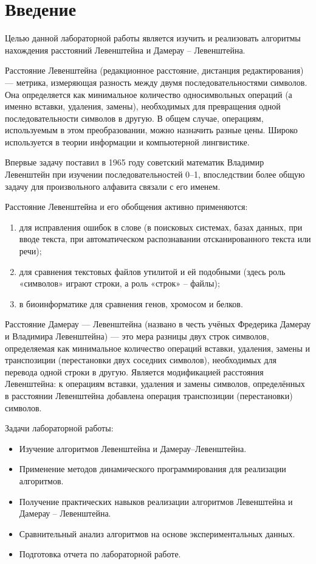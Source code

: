\chapter*{Введение}

Целью данной лабораторной работы является изучить и реализовать алгоритмы нахождения расстояний Левенштейна и Дамерау -- Левенштейна.

Расстояние Левенштейна (редакционное расстояние, дистанция редактирования) — метрика, измеряющая разность между двумя последовательностями символов. Она определяется как минимальное количество односимвольных операций (а именно вставки, удаления, замены), необходимых для превращения одной последовательности символов в другую. В общем случае, операциям, используемым в этом преобразовании, можно назначить разные цены. Широко используется в теории информации и компьютерной лингвистике.

Впервые задачу поставил в 1965 году советский математик Владимир Левенштейн при изучении последовательностей 0--1, впоследствии более общую задачу для произвольного алфавита связали с его именем.

Расстояние Левенштейна и его обобщения активно применяются: 
\begin{enumerate}[label={\arabic*)}]
	\item для исправления ошибок в слове (в поисковых системах, базах данных, при вводе текста, при автоматическом распознавании отсканированного текста или речи);
	\item для сравнения текстовых файлов утилитой  и ей подобными (здесь роль «символов» играют строки, а роль «строк» -- файлы);
	\item в биоинформатике для сравнения генов, хромосом и белков.
\end{enumerate}

Расстояние Дамерау — Левенштейна (названо в честь учёных Фредерика Дамерау и Владимира Левенштейна) — это мера разницы двух строк символов, определяемая как минимальное количество операций вставки, удаления, замены и транспозиции (перестановки двух соседних символов), необходимых для перевода одной строки в другую. Является модификацией расстояния Левенштейна: к операциям вставки, удаления и замены символов, определённых в расстоянии Левенштейна добавлена операция транспозиции (перестановки) символов.

Задачи лабораторной работы:

\begin{itemize}
	\item Изучение алгоритмов Левенштейна и Дамерау--Левенштейна.
	\item Применение методов динамического программирования для реализации алгоритмов.
	\item Получение практических навыков реализации алгоритмов Левенштейна и Дамерау -- Левенштейна.
	\item Сравнительный анализ алгоритмов на основе экспериментальных данных.
	\item Подготовка отчета по лабораторной работе.
\end{itemize}
